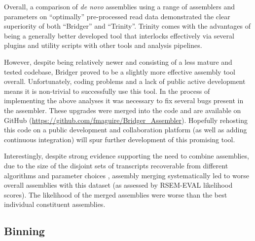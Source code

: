 Overall, a comparison of \textit{de novo} assemblies
using a range of assemblers and parameters on ``optimally'' pre-processed
read data demonstrated the clear superiority of both ``Bridger'' and ``Trinity''.
Trinity comes with the advantages of being a generally better developed tool that interlocks effectively via several plugins and utility
scripts with other tools and analysis pipelines.  

However, despite being relatively newer and consisting of
a less mature and tested codebase, Bridger proved to be
a slightly more effective assembly tool overall. Unfortunately,
coding problems and a lack of public active development means 
it is non-trivial to successfully use this tool.  In the process of 
implementing the above analyses it was necessary to fix several
bugs present in the assembler. These upgrades were merged into
the code and are available on GitHub (\url{https://github.com/fmaguire/Bridger_Assembler}).
Hopefully rehosting this code on a public development and collaboration
platform (as well as adding continuous integration) will 
spur further development of this promising tool.


Interestingly, despite strong evidence supporting the need to combine assemblies, due to the 
size of the disjoint sets of transcripts recoverable from different algorithms and parameter
choices \citep{Lowe2014}, assembly merging systematically led to worse overall assemblies
with this dataset (as assessed by RSEM-EVAL likelihood scores).  The likelihood of the merged
assemblies were worse than the best individual constituent assemblies.


\subsection{Binning}


